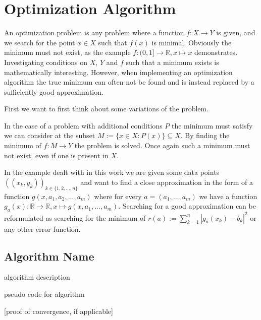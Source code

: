 \chapter{Optimization Algorithm}
\label{chapter:optimization}

An optimization problem is any problem where a function $f:X \rightarrow Y$ is given, and we search for the point $x \in X$ such that $f(x)$ is minimal. Obviously the minimum must not exist, as the example $f: (0, 1] \rightarrow \mathbb{R}, x \mapsto x$ demonstrates. Investigating conditions on $X$, $Y$ and $f$ such that a minimum exists is mathematically interesting. However, when implementing an optimization algorithm the true minimum can often not be found and is instead replaced by a sufficiently good approximation.

First we want to first think about some variations of the problem.

In the case of a problem with additional conditions $P$ the minimum must satisfy we can consider at the subset $M:= \{x \in X: P(x)\} \subseteq X$. By finding the minimum of $f: M \rightarrow Y$ the problem is solved. Once again such a minimum must not exist, even if one is present in $X$.


In the example dealt with in this work we are given some data points $((x_k, y_k))_{k \in \{1, 2, ..., n\}}$ and want to find a close approximation in the form of a function $g(x, a_1, a_2, ..., a_m)$ where for every $a = (a_1, ..., a_m)$ we have a function $g_a(x) : \mathbb{R} \rightarrow \mathbb{R}, x \mapsto g(x, a_1, ..., a_m)$. Searching for a good approximation can be reformulated as searching for the minimum of $r(a) := \sum_{k=1}^{n} |g_a(x_k) - b_k|^2$ or any other error function.

\section{Algorithm Name}

algorithm description

pseudo code for algorithm

[proof of convergence, if applicable]